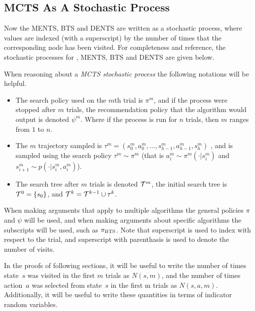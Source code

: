 \subsection{MCTS As A Stochastic Process}
    Now the MENTS, BTS and DENTS are written as a stochastic process, where values are indexed (with a superscript) by the number of times that the corresponding node has been visited. For completeness and reference, the stochastic processes for , MENTS, BTS and DENTS are given below.
    



    When reasoning about a \textit{MCTS stochastic process} the following notations will be helpful.
    \begin{itemize}
        \item 
            The search policy used on the $m$th trial is $\pi^m$, and if the process were stopped after $m$ trials, the recommendation policy that the algorithm would output is denoted $\psi^m$. Where if the process is run for $n$ trials, then $m$ ranges from $1$ to $n$.
        \item 
            The $m$ trajectory sampled is $\tau^m=(s_0^m,a_0^m,...,s_{h-1}^m,a_{h-1}^m,s_{h}^m)$ , and is sampled using the search policy $\tau^m \sim \pi^m$ (that is $a^m_i \sim \pi^m(\cdot|s^m_i)$ and $s^m_{i+1} \sim p(\cdot | s^m_i, a^m_i)$). 
        \item 
            The search tree after $m$ trials is denoted $\mathcal{T}^m$, the initial search tree is $\mathcal{T}^0=\{s_0\}$, and $\mathcal{T}^k = \mathcal{T}^{k-1} \cup \tau^k$.
    \end{itemize}

    When making arguments that apply to multiple algorithms the general policies $\pi$ and $\psi$ will be used, and when making arguments about specific algorithms the subscripts will be used, such as ${\pi_{{\textnormal{BTS}}}}$. Note that superscript is used to index with respect to the trial, and superscript with parenthasis is used to denote the number of visits.

    In the proofs of following sections, it will be useful to write the number of times state~$s$ was visited in the first $m$ trials as $N(s,m)$, and the number of times action~$a$ was selected from state~$s$ in the first m trials as $N(s,a,m).$ Additionally, it will be useful to write these quantities in terms of indicator random variables. 
    
